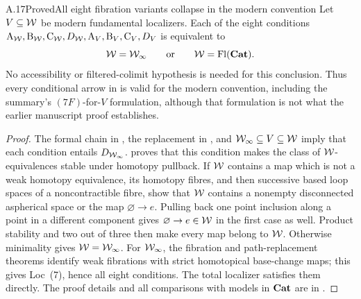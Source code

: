 \begin{claim}{A.17}{Proved}{All eight fibration variants collapse in the modern convention}
Let $V\subseteq\mathcal{W}$ be modern fundamental localizers. Each of the eight conditions $\mathrm A_{\mathcal{W}},\allowbreak\mathrm B_{\mathcal{W}},\allowbreak\mathrm C_{\mathcal{W}},\allowbreak D_{\mathcal{W}},\allowbreak\mathrm A_V,\allowbreak\mathrm B_V,\allowbreak\mathrm C_V,\allowbreak D_V$ is equivalent to
\[
\mathcal{W}=\mathcal{W}_{\infty}\qquad\text{or}\qquad\mathcal{W}=\operatorname{Fl}(\mathbf{Cat}).
\]
No accessibility or filtered-colimit hypothesis is needed for this conclusion. Thus every conditional arrow in  is valid for the modern convention, including the summary's $(7F)$-for-$V$ formulation, although that formulation is not what the earlier manuscript proof establishes.
\end{claim}
\begin{proof}
The formal chain in , the replacement in , and $\mathcal{W}_{\infty}\subseteq V\subseteq\mathcal{W}$ imply that each condition entails $D_{\mathcal{W}_{\infty}}$.  proves that this condition makes the class of $\mathcal{W}$-equivalences stable under homotopy pullback. If $\mathcal{W}$ contains a map which is not a weak homotopy equivalence, its homotopy fibres, and then successive based loop spaces of a noncontractible fibre, show that $\mathcal{W}$ contains a nonempty disconnected aspherical space or the map $\varnothing\to e$. Pulling back one point inclusion along a point in a different component gives $\varnothing\to e\in\mathcal{W}$ in the first case as well. Product stability and two out of three then make every map belong to $\mathcal{W}$. Otherwise minimality gives $\mathcal{W}=\mathcal{W}_{\infty}$. For $\mathcal{W}_{\infty}$, the fibration and path-replacement theorems identify weak fibrations with strict homotopical base-change maps; this gives Loc~(7), hence all eight conditions. The total localizer satisfies them directly. The proof details and all comparisons with models in $\mathbf{Cat}$ are in .
\end{proof}

